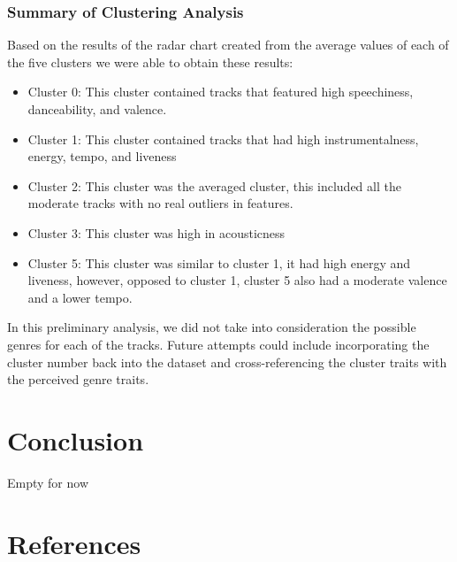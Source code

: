\documentclass[11pt, a4paper, twocolumn]{article}
\begin{document}
\subsubsection{Summary of Clustering Analysis}
Based on the results of the radar chart created from the average values of each of the five clusters we were able to obtain these results: 
\begin{itemize}
\item Cluster 0: This cluster contained tracks that featured high speechiness, danceability, and valence. 
\item Cluster 1: This cluster contained tracks that had high instrumentalness, energy, tempo, and liveness
\item Cluster 2: This cluster was the averaged cluster, this included all the moderate tracks with no real outliers in features. 
\item Cluster 3: This cluster was high in acousticness
\item Cluster 5: This cluster was similar to cluster 1, it had high energy and liveness, however, opposed to cluster 1, cluster 5 also had a moderate valence and a lower tempo. 
\end{itemize}
In this preliminary analysis, we did not take into consideration the possible genres for each of the tracks. Future attempts could include incorporating the cluster number back into the dataset and cross-referencing the cluster traits with the perceived genre traits. 
\section{Conclusion}
Empty for now

\section{References}
\end{document}
